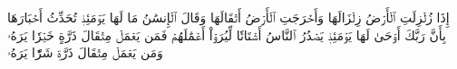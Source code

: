 إِذَا زُلۡزِلَتِ ٱلۡأَرۡضُ زِلۡزَالَهَا
وَأَخۡرَجَتِ ٱلۡأَرۡضُ أَثۡقَالَهَا
وَقَالَ ٱلۡإِنسَٰنُ مَا لَهَا
يَوۡمَئِذٖ تُحَدِّثُ أَخۡبَارَهَا
بِأَنَّ رَبَّكَ أَوۡحَىٰ لَهَا
يَوۡمَئِذٖ يَصۡدُرُ ٱلنَّاسُ أَشۡتَاتٗا لِّيُرَوۡاْ أَعۡمَٰلَهُمۡ
فَمَن يَعۡمَلۡ مِثۡقَالَ ذَرَّةٍ خَيۡرٗا يَرَهُۥ
وَمَن يَعۡمَلۡ مِثۡقَالَ ذَرَّةٖ شَرّٗا يَرَهُۥ